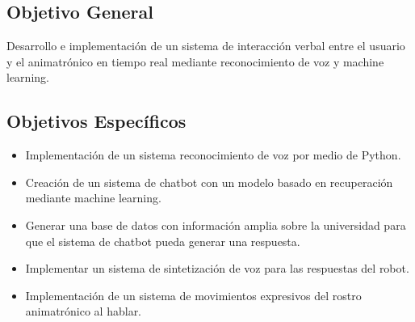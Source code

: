 \subsection*{Objetivo General}
Desarrollo e implementación de un sistema de interacción verbal entre el usuario y el animatrónico en tiempo real mediante reconocimiento de voz y machine learning.

\subsection*{Objetivos Específicos}
\begin{itemize}
\item Implementación de un sistema reconocimiento de voz por medio de Python.
\item Creación de un sistema de chatbot con un modelo basado en recuperación mediante machine learning.
\item Generar una base de datos con información amplia sobre la universidad para que el sistema de chatbot pueda generar una respuesta.
\item Implementar un sistema de sintetización de voz para las respuestas del robot.
\item Implementación de un sistema de movimientos expresivos del rostro animatrónico al hablar.
\end{itemize}